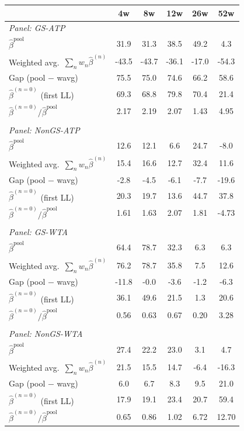 \begin{tabular}{l*{5}{c}}
\toprule
 & 4w & 8w & 12w & 26w & 52w \\
\midrule
\multicolumn{6}{l}{\textit{Panel: GS-ATP}} \\ \midrule
$\hat{\beta}^{\text{pool}}$ & 31.9 & 31.3 & 38.5 & 49.2 & 4.3 \\
Weighted avg.\ $\sum_n w_n \hat{\beta}^{(n)}$ & -43.5 & -43.7 & -36.1 & -17.0 & -54.3 \\
Gap (pool $-$ wavg) & 75.5 & 75.0 & 74.6 & 66.2 & 58.6 \\
$\hat{\beta}^{(n=0)}$ (first LL) & 69.3 & 68.8 & 79.8 & 70.4 & 21.4 \\
$\hat{\beta}^{(n=0)}/\hat{\beta}^{\text{pool}}$ & 2.17 & 2.19 & 2.07 & 1.43 & 4.95 \\
\\[0.3em]
\multicolumn{6}{l}{\textit{Panel: NonGS-ATP}} \\ \midrule
$\hat{\beta}^{\text{pool}}$ & 12.6 & 12.1 & 6.6 & 24.7 & -8.0 \\
Weighted avg.\ $\sum_n w_n \hat{\beta}^{(n)}$ & 15.4 & 16.6 & 12.7 & 32.4 & 11.6 \\
Gap (pool $-$ wavg) & -2.8 & -4.5 & -6.1 & -7.7 & -19.6 \\
$\hat{\beta}^{(n=0)}$ (first LL) & 20.3 & 19.7 & 13.6 & 44.7 & 37.8 \\
$\hat{\beta}^{(n=0)}/\hat{\beta}^{\text{pool}}$ & 1.61 & 1.63 & 2.07 & 1.81 & -4.73 \\
\\[0.3em]
\multicolumn{6}{l}{\textit{Panel: GS-WTA}} \\ \midrule
$\hat{\beta}^{\text{pool}}$ & 64.4 & 78.7 & 32.3 & 6.3 & 6.3 \\
Weighted avg.\ $\sum_n w_n \hat{\beta}^{(n)}$ & 76.2 & 78.7 & 35.8 & 7.5 & 12.6 \\
Gap (pool $-$ wavg) & -11.8 & -0.0 & -3.6 & -1.2 & -6.3 \\
$\hat{\beta}^{(n=0)}$ (first LL) & 36.1 & 49.6 & 21.5 & 1.3 & 20.6 \\
$\hat{\beta}^{(n=0)}/\hat{\beta}^{\text{pool}}$ & 0.56 & 0.63 & 0.67 & 0.20 & 3.28 \\
\\[0.3em]
\multicolumn{6}{l}{\textit{Panel: NonGS-WTA}} \\ \midrule
$\hat{\beta}^{\text{pool}}$ & 27.4 & 22.2 & 23.0 & 3.1 & 4.7 \\
Weighted avg.\ $\sum_n w_n \hat{\beta}^{(n)}$ & 21.5 & 15.5 & 14.7 & -6.4 & -16.3 \\
Gap (pool $-$ wavg) & 6.0 & 6.7 & 8.3 & 9.5 & 21.0 \\
$\hat{\beta}^{(n=0)}$ (first LL) & 17.9 & 19.1 & 23.4 & 20.7 & 59.4 \\
$\hat{\beta}^{(n=0)}/\hat{\beta}^{\text{pool}}$ & 0.65 & 0.86 & 1.02 & 6.72 & 12.70 \\
\bottomrule
\end{tabular}
